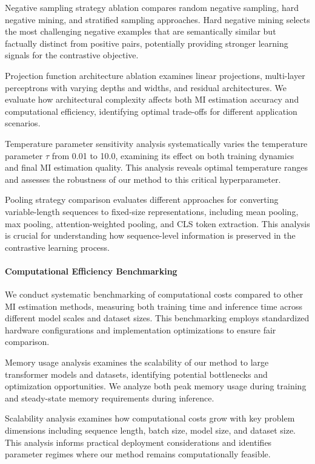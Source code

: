 Negative sampling strategy ablation compares random negative sampling, hard negative mining, and stratified sampling approaches. Hard negative mining selects the most challenging negative examples that are semantically similar but factually distinct from positive pairs, potentially providing stronger learning signals for the contrastive objective.

Projection function architecture ablation examines linear projections, multi-layer perceptrons with varying depths and widths, and residual architectures. We evaluate how architectural complexity affects both MI estimation accuracy and computational efficiency, identifying optimal trade-offs for different application scenarios.

Temperature parameter sensitivity analysis systematically varies the temperature parameter $\tau$ from 0.01 to 10.0, examining its effect on both training dynamics and final MI estimation quality. This analysis reveals optimal temperature ranges and assesses the robustness of our method to this critical hyperparameter.

Pooling strategy comparison evaluates different approaches for converting variable-length sequences to fixed-size representations, including mean pooling, max pooling, attention-weighted pooling, and CLS token extraction. This analysis is crucial for understanding how sequence-level information is preserved in the contrastive learning process.

\paragraph{Computational Efficiency Benchmarking}
We conduct systematic benchmarking of computational costs compared to other MI estimation methods, measuring both training time and inference time across different model scales and dataset sizes. This benchmarking employs standardized hardware configurations and implementation optimizations to ensure fair comparison.

Memory usage analysis examines the scalability of our method to large transformer models and datasets, identifying potential bottlenecks and optimization opportunities. We analyze both peak memory usage during training and steady-state memory requirements during inference.

Scalability analysis examines how computational costs grow with key problem dimensions including sequence length, batch size, model size, and dataset size. This analysis informs practical deployment considerations and identifies parameter regimes where our method remains computationally feasible.

